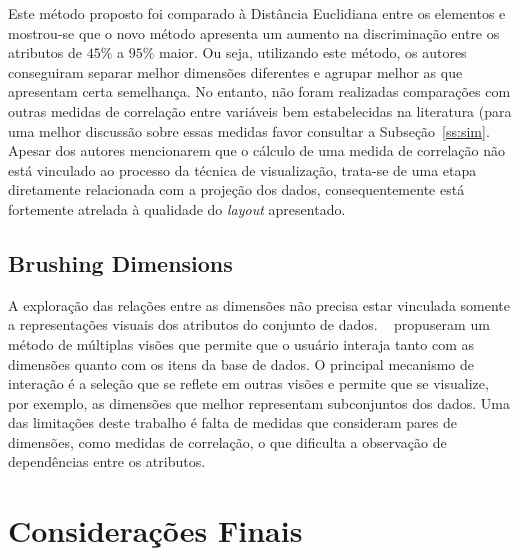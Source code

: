 Este método proposto foi comparado à Distância Euclidiana entre os elementos e mostrou-se que o novo método apresenta um aumento na discriminação entre os atributos de $45\%$ a $95\%$ maior. Ou seja, utilizando este método, os autores conseguiram separar melhor dimensões diferentes e agrupar melhor as que apresentam certa semelhança. No entanto, não foram realizadas comparações com outras medidas de correlação entre variáveis bem estabelecidas na  literatura (para uma melhor discussão sobre essas medidas favor consultar a Subseção~\ref{ss:sim}. Apesar dos autores mencionarem que o cálculo de uma medida de correlação não está vinculado ao processo da técnica de visualização, trata-se de uma etapa diretamente relacionada com a projeção dos dados, consequentemente está fortemente atrelada à qualidade do \emph{layout} apresentado.

\subsection{Brushing Dimensions}

A exploração das relações entre as dimensões não precisa estar vinculada somente a representações visuais dos atributos do conjunto de dados. \citeauthor{Turkay2011}~\cite{Turkay2011} propuseram um método de múltiplas visões que permite que o usuário interaja tanto com as dimensões quanto com os itens da base de dados. O principal mecanismo de interação é a seleção que se reflete em outras visões e permite que se visualize, por exemplo, as dimensões que melhor representam subconjuntos dos dados. Uma das limitações deste trabalho é falta de medidas que consideram pares de dimensões, como medidas de correlação, o que dificulta a observação de dependências entre os atributos.  

\section{Considerações Finais}





